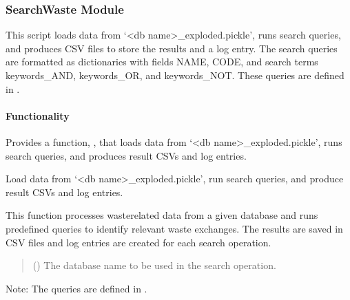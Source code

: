 \documentclass[letterpaper,10pt,english]{sphinxmanual}
\begin{document}
\subsubsection{SearchWaste Module}
\label{\detokenize{WasteAndMaterialFootprint:searchwaste-module}}
\sphinxAtStartPar
This script loads data from ‘\textless{}db name\textgreater{}\_exploded.pickle’, runs search queries, 
and produces CSV files to store the results and a log entry. The search queries are 
formatted as dictionaries with fields NAME, CODE, and search terms keywords\_AND, 
keywords\_OR, and keywords\_NOT. These queries are defined in .


\paragraph{Functionality}
\label{\detokenize{WasteAndMaterialFootprint:functionality}}
\sphinxAtStartPar
Provides a function, {\hyperref[\detokenize{WasteAndMaterialFootprint:WasteAndMaterialFootprint.SearchWaste.SearchWaste}]{}}, that loads data from ‘\textless{}db name\textgreater{}\_exploded.pickle’,
runs search queries, and produces result CSVs and log entries.

\begin{fulllineitems}
\label{\detokenize{WasteAndMaterialFootprint:WasteAndMaterialFootprint.SearchWaste.SearchWaste}}
\pysigstartsignatures
{}
\pysigstopsignatures
\sphinxAtStartPar
Load data from ‘\textless{}db name\textgreater{}\_exploded.pickle’, run search queries, and produce
result CSVs and log entries.

\sphinxAtStartPar
This function processes waste\sphinxhyphen{}related data from a given database and runs
predefined queries to identify relevant waste exchanges. The results are
saved in CSV files and log entries are created for each search operation.
\begin{quote}\begin{description}
\sphinxAtStartPar
{} () \textendash{} The database name to be used in the search operation.

\end{description}\end{quote}

\sphinxAtStartPar
Note:
The queries are defined in .

\end{fulllineitems}
\end{document}
